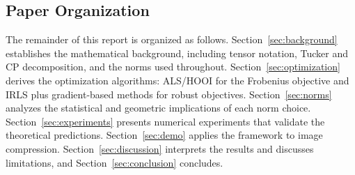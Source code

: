     \subsection*{Paper Organization}
        The remainder of this report is organized as follows. Section~\ref{sec:background} establishes the mathematical background, including tensor notation, Tucker and CP decomposition, and the norms used throughout. Section~\ref{sec:optimization} derives the optimization algorithms: ALS/HOOI for the Frobenius objective and IRLS plus gradient-based methods for robust objectives. Section~\ref{sec:norms} analyzes the statistical and geometric implications of each norm choice. Section~\ref{sec:experiments} presents numerical experiments that validate the theoretical predictions. Section~\ref{sec:demo} applies the framework to image compression. Section~\ref{sec:discussion} interprets the results and discusses limitations, and Section~\ref{sec:conclusion} concludes.\\





